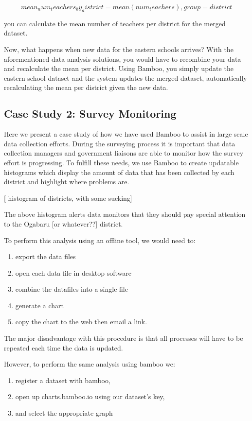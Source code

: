 \documentclass{acm_proc_article-sp}
\begin{document}
$$mean_num_teachers_by_district=mean(num_teachers), group=district$$

you can calculate the mean number of teachers per district for the merged dataset.

Now, what happens when new data for the eastern schools arrives?  With the aforementioned data analysis solutions, you would have to recombine your data and recalculate the mean per district.  Using Bamboo, you simply update the eastern school dataset and the system updates the merged dataset, automatically recalculating the mean per district given the new data.

\subsection{Case Study 2: Survey Monitoring}

Here we present a case study of how we have used Bamboo to assist in large scale data collection efforts.  During the surveying process it is important that data collection managers and government liaisons are able to monitor how the survey effort is progressing.  To fulfill these needs, we use Bamboo to create updatable histograms which display the amount of data that has been collected by each district and highlight where problems are.

[ histogram of districts, with some sucking]

The above histogram alerts data monitors that they should pay special attention to the Ogabaru [or whatever??] district.

To perform this analysis using an offline tool, we would need to:

\begin{enumerate}
\item export the data files
\item open each data file in desktop software
\item combine the datafiles into a single file
\item generate a chart
\item copy the chart to the web then email a link.
\end{enumerate}

The major disadvantage with this procedure is that all processes will have to be repeated each time the data is updated.

However, to perform the same analysis using bamboo we:

\begin{enumerate}
\item register a dataset with bamboo,
\item open up charts.bamboo.io using our dataset’s key,
\item and select the appropriate graph
\end{enumerate}
\end{document}
